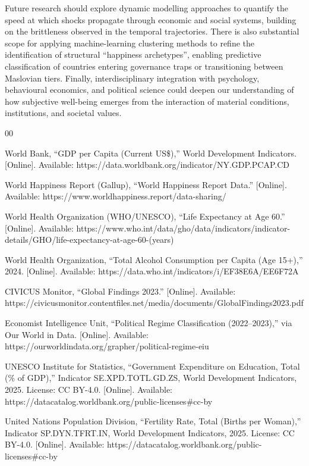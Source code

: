 \documentclass[conference]{IEEEtran}
\begin{document}
Future research should explore dynamic modelling approaches to quantify the speed at which shocks propagate through economic and social systems, building on the brittleness observed in the temporal trajectories. There is also substantial scope for applying machine-learning clustering methods to refine the identification of structural “happiness archetypes”, enabling predictive classification of countries entering governance traps or transitioning between Maslovian tiers. Finally, interdisciplinary integration with psychology, behavioural economics, and political science could deepen our understanding of how subjective well-being emerges from the interaction of material conditions, institutions, and societal values.

\begin{thebibliography}{00}

 World Bank, ``GDP per Capita (Current US\$),'' World Development Indicators. [Online]. Available: https://data.worldbank.org/indicator/NY.GDP.PCAP.CD

 World Happiness Report (Gallup), ``World Happiness Report Data.'' [Online]. Available: https://www.worldhappiness.report/data-sharing/

 World Health Organization (WHO/UNESCO), ``Life Expectancy at Age 60.'' [Online]. Available: 
https://www.who.int/data/gho/data/indicators/indicator-details/GHO/life-expectancy-at-age-60-(years)

 World Health Organization, ``Total Alcohol Consumption per Capita (Age 15+),'' 2024. [Online]. Available: 
https://data.who.int/indicators/i/EF38E6A/EE6F72A

 CIVICUS Monitor, ``Global Findings 2023.'' [Online]. Available: 
https://civicusmonitor.contentfiles.net/media/documents/GlobalFindings2023.pdf

 Economist Intelligence Unit, ``Political Regime Classification (2022–2023),'' via Our World in Data. [Online]. Available: 
https://ourworldindata.org/grapher/political-regime-eiu

 UNESCO Institute for Statistics, ``Government Expenditure on Education, Total (\% of GDP),'' Indicator SE.XPD.TOTL.GD.ZS, World Development Indicators, 2025. License: CC BY-4.0.  
[Online]. Available: https://datacatalog.worldbank.org/public-licenses\#cc-by

 United Nations Population Division, ``Fertility Rate, Total (Births per Woman),'' Indicator SP.DYN.TFRT.IN, World Development Indicators, 2025. License: CC BY-4.0.  
[Online]. Available: https://datacatalog.worldbank.org/public-licenses\#cc-by


\end{thebibliography}
\end{document}
